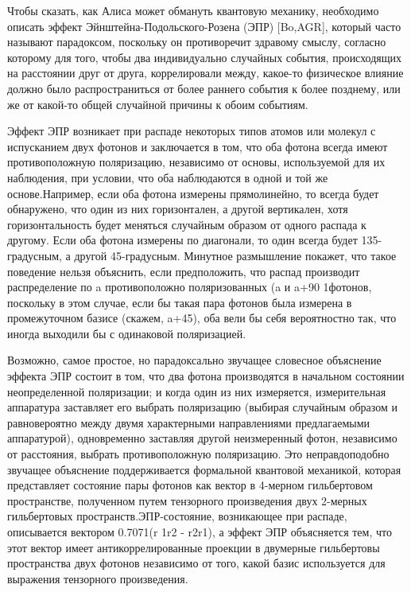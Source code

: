 Чтобы ­­сказать, как Алиса может обмануть квантовую механику, необходимо описать эффект Эйнштейна-Подольского-Розена (ЭПР) [Bo,AGR], который часто называют парадоксом, поскольку он противоречит здравому смыслу, согласно которому для того, чтобы два индивидуально случайных события, происходящих на расстоянии друг от друга, коррелировали между, какое-то физическое влияние должно было распространиться от более раннего события к более позднему, или же от какой-то общей случайной причины к обоим событиям.

­­­­Эффект ЭПР возникает при распаде некоторых типов атомов или молекул с испусканием двух фотонов и заключается в том, что оба фотона всегда имеют противоположную поляризацию, независимо от основы, используемой для их наблюдения, при условии, что оба наблюдаются в одной и той же основе.Например, если оба фотона измерены прямолинейно, то всегда будет обнаружено, что один из них горизонтален, а другой вертикален, хотя горизонтальность будет меняться случайным образом от одного распада к другому. Если оба фотона измерены по диагонали, то один всегда будет 135-градусным, а другой 45-градусным. Минутное размышление покажет, что такое поведение нельзя объяснить, если предположить, что распад производит распределение по a противоположно поляризованных (a и a+90 1фотонов, поскольку в этом случае, если бы такая пара фотонов была измерена в промежуточном базисе (скажем, a+45), оба вели бы себя вероятностно так, что иногда выходили бы с одинаковой поляризацией.

­­­­Возможно, самое простое, но парадоксально звучащее словесное объяснение эффекта ЭПР состоит в том, что два фотона производятся в начальном состоянии неопределенной поляризации; и когда один из них измеряется, измерительная аппаратура заставляет его выбрать поляризацию (выбирая случайным образом и равновероятно между двумя характерными направлениями предлагаемыми аппаратурой), одновременно заставляя другой неизмеренный фотон, независимо от расстояния, выбрать противоположную поляризацию. Это неправдоподобно звучащее объяснение поддерживается формальной квантовой механикой, которая представляет состояние пары фотонов как вектор в 4-мерном гильбертовом пространстве, полученном путем тензорного произведения двух 2-мерных гильбертовых пространств.ЭПР-состояние, возникающее при распаде, описывается вектором 0.7071(r 1r2 - r2r1), а эффект ЭПР объясняется тем, что этот вектор имеет антикоррелированные проекции в двумерные гильбертовы пространства двух фотонов независимо от того, какой базис используется для выражения тензорного произведения.

